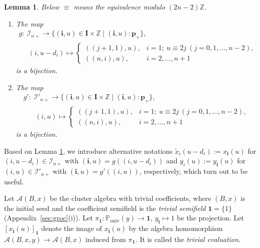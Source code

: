 \documentclass[11pt]{article}
\numberwithin{equation}{section}
\newtheorem{Lemma}[Theorem]{Lemma}
\theoremstyle{definition}
\begin{document}
\begin{Lemma}
\label{lem:gmap}
Below $\equiv$ means the equivalence modulo $(2n-2)\mathbb{Z}$.

\begin{enumerate}\itemsep=0pt
\item[$(i)$]
The map
\begin{gather*}
g:  \ \mathcal{I}_{n+} \rightarrow
\{ (\mathbf{i},u)\in \mathbf{I}\times \mathbb{Z} \mid
(\mathbf{i},u): \mathbf{p}_+
\}, \\
\phantom{g: \ } \ (i,u-d_i) \mapsto
\begin{cases}
((j+1,1),u), & i= 1; \
u \equiv 2j
\ (j=0,1,\dots,n-2),\\
((n,i),u), & i=2,\dots,n+1
\end{cases}
\end{gather*}
is a bijection.

\item[$(ii)$]
The map
\begin{gather*}
g': \  \mathcal{I}'_{n+} \rightarrow
\{ (\mathbf{i},u)\in \mathbf{I}\times \mathbb{Z} \mid
 (\mathbf{i},u): \mathbf{p}_+
\}, \\
\phantom{g': \ }{} \  (i,u) \mapsto
\begin{cases}
((j+1,1),u), & i= 1;\
u\equiv 2j
\ (j=0,1,\dots,n-2), \\
((n,i),u), &  i=2,\dots,n+1
\end{cases}
\end{gather*}
is a bijection.
\end{enumerate}
\end{Lemma}

Based on Lemma \ref{lem:gmap},
we introduce alternative notations
$\tilde{x}_i(u-d_i):=x_{\mathbf{i}}(u)$
for $(i,u-d_i)\in \mathcal{I}_{n+}$
with $(\mathbf{i},u)=g((i,u-d_i))$
and
$y_i(u):=y_{\mathbf{i}}(u)$
for $(i,u)\in \mathcal{I}'_{n+}$
with $(\mathbf{i},u)=g'((i,u))$,
respectively,
which turn out to be useful.

 Let $\mathcal{A}(B,x)$ be the cluster algebra
with trivial coef\/f\/icients, where $(B,x)$ is
the initial seed
and the coef\/f\/icient semif\/ield
is the {\em trivial semifield\/}
 $\mathbf{1}=\{1\}$ (Appendix~\ref{sec:groc}(i)).
Let $\pi_{\mathbf{1}}:
\mathbb{P}_{\mathrm{univ}}(y)\rightarrow
\mathbf{1}$, $y_{\mathbf{i}}\mapsto 1$ be the projection.
Let $[x_{\mathbf{i}}(u)]_{\mathbf{1}}$
denote the image of $x_{\mathbf{i}}(u)$
 by the algebra homomorphism
$\mathcal{A}(B,x,y)\rightarrow \mathcal{A}(B,x)$
 induced from $\pi_{\mathbf{1}}$.
It is called the {\em trivial evaluation}.
\end{document}
